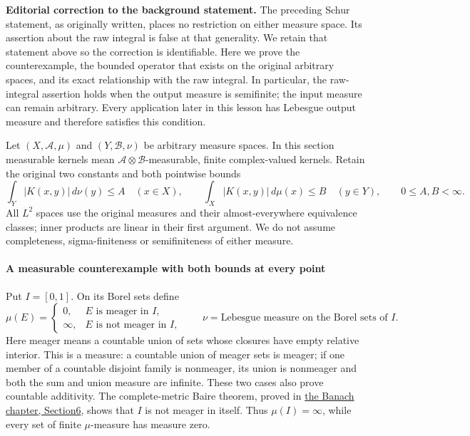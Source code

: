 \documentclass[
  11pt,
]{article}
\begin{document}
\textbf{Editorial correction to the background statement.} The preceding
Schur statement, as originally written, places no restriction on either
measure space. Its assertion about the raw integral is false at that
generality. We retain that statement above so the correction is
identifiable. Here we prove the counterexample, the bounded operator
that exists on the original arbitrary spaces, and its exact relationship
with the raw integral. In particular, the raw-integral assertion holds
when the output measure is semifinite; the input measure can remain
arbitrary. Every application later in this lesson has Lebesgue output
measure and therefore satisfies this condition.

Let \((X,\mathcal A,\mu)\) and \((Y,\mathcal B,\nu)\) be arbitrary
measure spaces. In this section measurable kernels mean
\(\mathcal A\otimes\mathcal B\)-measurable, finite complex-valued
kernels. Retain the original two constants and both pointwise bounds \[
 \int_Y|K(x,y)|\,d\nu(y)\leq A\quad(x\in X),\qquad
 \int_X|K(x,y)|\,d\mu(x)\leq B\quad(y\in Y),
 \qquad 0\leq A,B<\infty .
 \tag{SC1}
\] All \(L^2\) spaces use the original measures and their
almost-everywhere equivalence classes; inner products are linear in
their first argument. We do not assume completeness, sigma-finiteness or
semifiniteness of either measure.

\paragraph{A measurable counterexample with both bounds at every
point}\label{a-measurable-counterexample-with-both-bounds-at-every-point}

Put \(I=[0,1]\). On its Borel sets define \[
 \mu(E)=
 \begin{cases}0,&E\text{ is meager in }I,\\
 \infty,&E\text{ is not meager in }I,\end{cases}
 \qquad \nu=\text{Lebesgue measure on the Borel sets of }I.
 \tag{SC2}
\] Here meager means a countable union of sets whose closures have empty
relative interior. This is a measure: a countable union of meager sets
is meager; if one member of a countable disjoint family is nonmeager,
its union is nonmeager and both the sum and union measure are infinite.
These two cases also prove countable additivity. The complete-metric
Baire theorem, proved in
\href{banach-foundation-bridges.pdf\#section*.14}{the Banach chapter,
Section6}, shows that \(I\) is not meager in itself. Thus
\(\mu(I)=\infty\), while every set of finite \(\mu\)-measure has measure
zero.
\end{document}

